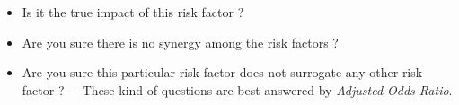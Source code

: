 \documentclass[11pt, a4paper]{article}
\begin{document}
\begin{itemize}
\item Is it the true impact of this risk factor ? 

\item Are you sure there is no synergy among the risk factors ? 

\item Are you sure this particular risk factor does not surrogate any other risk factor ?  $-$ These kind of questions are best answered by \textit{Adjusted Odds Ratio}. 
\end{itemize}
 
 
 
\end{document}
